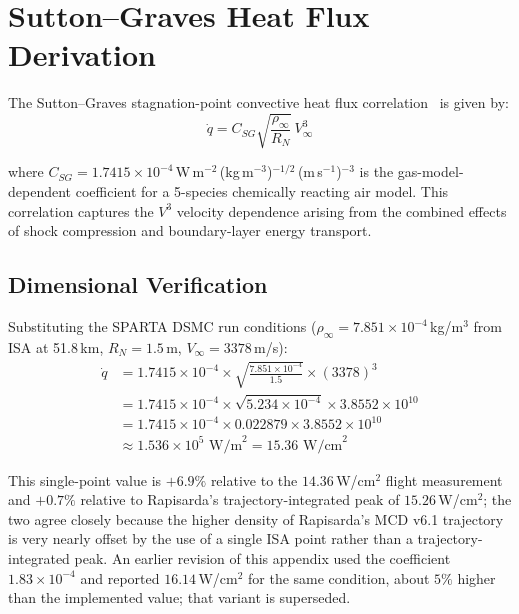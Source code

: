 \section{Sutton--Graves Heat Flux Derivation}

The Sutton--Graves stagnation-point convective heat flux correlation~\cite{sutton1971gravesh} is given by:
\begin{equation}
    \dot{q} = C_{SG} \sqrt{\frac{\rho_\infty}{R_N}} \, V_\infty^3
    \label{eq:sg_derivation}
\end{equation}

\noindent where $C_{SG} = 1.7415 \times 10^{-4}$\,W\,m$^{-2}$\,(kg\,m$^{-3}$)$^{-1/2}$\,(m\,s$^{-1}$)$^{-3}$ is the gas-model-dependent coefficient for a 5-species chemically reacting air model. This correlation captures the $V^3$ velocity dependence arising from the combined effects of shock compression and boundary-layer energy transport.

\subsection{Dimensional Verification}

Substituting the SPARTA DSMC run conditions ($\rho_\infty = 7.851 \times 10^{-4}$\,kg/m$^3$ from ISA at 51.8\,km, $R_N = 1.5$\,m, $V_\infty = 3378$\,m/s):
\begin{align}
    \dot{q} &= 1.7415 \times 10^{-4} \times \sqrt{\frac{7.851 \times 10^{-4}}{1.5}} \times (3378)^3 \nonumber \\
    &= 1.7415 \times 10^{-4} \times \sqrt{5.234 \times 10^{-4}} \times 3.8552 \times 10^{10} \nonumber \\
    &= 1.7415 \times 10^{-4} \times 0.022879 \times 3.8552 \times 10^{10} \nonumber \\
    &\approx 1.536 \times 10^{5} \text{ W/m}^2 = 15.36 \text{ W/cm}^2
    \label{eq:sg_baseline}
\end{align}

\noindent This single-point value is $+6.9\%$ relative to the $14.36$\,W/cm$^2$ flight measurement and $+0.7\%$ relative to Rapisarda's trajectory-integrated peak of $15.26$\,W/cm$^2$; the two agree closely because the higher density of Rapisarda's MCD v6.1 trajectory is very nearly offset by the use of a single ISA point rather than a trajectory-integrated peak. An earlier revision of this appendix used the coefficient $1.83 \times 10^{-4}$ and reported $16.14$\,W/cm$^2$ for the same condition, about $5\%$ higher than the implemented value; that variant is superseded.

